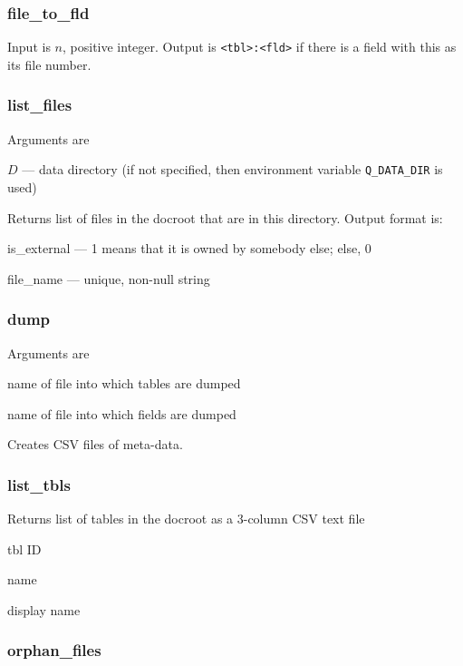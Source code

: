 \subsubsection{file\_to\_fld}
\label{file_to_fld}

Input is \(n\), positive integer. Output is \verb+<tbl>:<fld>+ if there
is a field with this as its file number.

\subsubsection{list\_files}
\label{list_files}

Arguments are
\be
\item \(D\) --- data directory (if not specified, then environment
    variable \verb+Q_DATA_DIR+ is used)
\ee

Returns list of files in the docroot that are in this directory. Output
format is:
\be
\item is\_external --- 1 means that it is owned by somebody else; else, 0
\item file\_name  --- unique, non-null string
\ee

\subsubsection{dump}
\label{dump}

Arguments are
\be
\item name of file into which tables are dumped
\item name of file into which fields are dumped
\ee

Creates CSV files of meta-data.

\subsubsection{list\_tbls}
\label{list_tbls}

Returns list of tables in the docroot as a 3-column CSV text file
\be
\item  tbl ID
\item name
\item display name
\ee

\subsubsection{orphan\_files}
\label{orphan_files}

